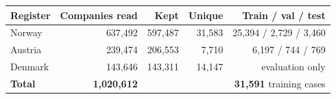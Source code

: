 \begin{tabular}{lrrrr}
\toprule
Register & Companies read & Kept & Unique & Train / val / test \\
\midrule
Norway & 637,492 & 597,487 & 31,583 & 25,394 / 2,729 / 3,460 \\
Austria & 239,474 & 206,553 & 7,710 & 6,197 / 744 / 769 \\
Denmark & 143,646 & 143,311 & 14,147 & evaluation only \\
\textbf{Total} & \textbf{1,020,612} &  &  & \textbf{31,591} training cases \\
\bottomrule
\end{tabular}
